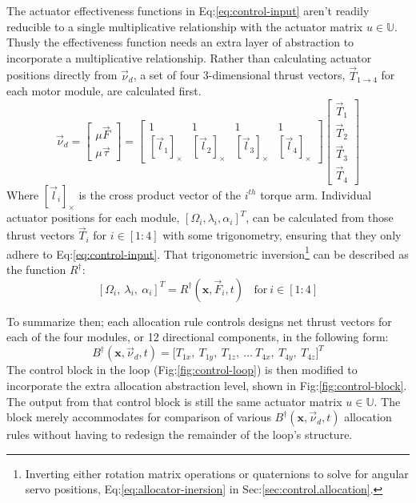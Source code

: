 \par
The actuator effectiveness functions in Eq:\ref{eq:control-input} aren't readily reducible to a single multiplicative relationship with the actuator matrix $u\in\mathbb{U}$. Thusly the effectiveness function needs an extra layer of abstraction to incorporate a multiplicative relationship. Rather than calculating actuator positions directly from $\vec{\nu}_d$, a set of four 3-dimensional thrust vectors, $\vec{T}_{1\rightarrow 4}$ for each motor module, are calculated first.
\begin{equation}\label{eq:4.7}
\vec{\nu}_d=\begin{bmatrix}
\mu\vec{F}\\
\mu\vec{\tau}
\end{bmatrix}
= 
\begin{bmatrix}
1 & 1 & 1 & 1\\
[\vec{l}_1]_\times & [\vec{l}_2]_\times & [\vec{l}_3]_\times & [\vec{l}_4]_\times
\end{bmatrix}
\begin{bmatrix}
\vec{T}_1\\
\vec{T}_2\\
\vec{T}_3\\
\vec{T}_4
\end{bmatrix}
\end{equation}
Where $[\vec{l}_i]_\times$ is the cross product vector of the $i^{th}$ torque arm. Individual actuator positions for each module, $[\Omega_i,\lambda_i,\alpha_i]^T$, can be calculated from those thrust vectors $\vec{T}_i$ for $i\in[1:4]$ with some trigonometry, ensuring that they only adhere to Eq:\ref{eq:control-input}. That trigonometric inversion\footnote{Inverting either rotation matrix operations or quaternions to solve for angular servo positions, Eq:\ref{eq:allocator-inersion} in Sec:\ref{sec:control.allocation}.} can be described as the function $R^\dagger$:
\begin{equation}\label{eq:4.8}
[\Omega_i,~\lambda_i,~\alpha_i]^T=R^\dagger(\mathbf{x},\vec{F}_i,t)~~~~\text{for}~i\in[1:4]
\end{equation}
\par
To summarize then; each allocation rule controls designs net thrust vectors for each of the four modules, or 12 directional components, in the following form:
\begin{equation}
B^{\dagger}(\mathbf{x},\vec{\nu}_d,t)=\big[ T_{1x},~T_{1y},~T_{1z},~\ldots~T_{4x},~T_{4y},~T_{4z}\big]^T
\end{equation}
The control block in the loop (Fig:\ref{fig:control-loop}) is then modified to incorporate the extra allocation abstraction level, shown in Fig:\ref{fig:control-block}. The output from that control block is still the same actuator matrix $u\in\mathbb{U}$. The block merely accommodates for comparison of various $B^\dagger(\mathbf{x},\vec{\nu}_d,t)$ allocation rules without having to redesign the remainder of the loop's structure.
